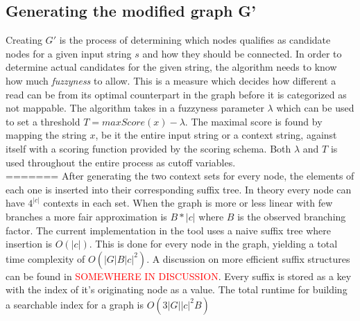 \documentclass{article}
\begin{document}
\subsection{Generating the modified graph G'}
Creating $G'$ is the process of determining which nodes qualifies as candidate nodes for a given input string $s$ and how they should be connected. In order to determine actual candidates for the given string, the algorithm needs to know how much \textit{fuzzyness} to allow. This is a measure which decides how different a read can be from its optimal counterpart in the graph before it is categorized as not mappable. The algorithm takes in a fuzzyness parameter $\lambda$ which can be used to set a threshold $T=maxScore(x)-\lambda$. The maximal score is found by mapping the string $x$, be it the entire input string or a context string, against itself with a scoring function provided by the scoring schema. Both $\lambda$ and $T$ is used throughout the entire process as cutoff variables.\\
=======
After generating the two context sets for every node, the elements of each one is inserted into their corresponding suffix tree. In theory every node can have $4^{|c|}$ contexts in each set. When the graph is more or less linear with few branches a more fair approximation is $B*|c|$ where $B$ is the observed branching factor. The current implementation in the tool uses a naive suffix tree where insertion is $O(|c|)$. This is done for every node in the graph, yielding a total time complexity of $O(|G|B|c|^2)$. A discussion on more efficient suffix structures can be found in \textcolor{red}{SOMEWHERE IN DISCUSSION}. Every suffix is stored as a key with the index of it's originating node as a value. The total runtime for building a searchable index for a graph is $O(3|G||c|^2B)$
\end{document}
